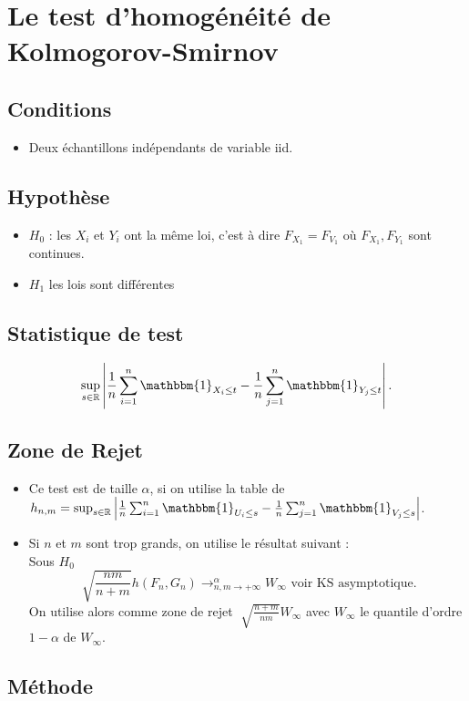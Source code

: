 \documentclass{article}
\theoremstyle{plain}%
\theoremstyle{definition}
\theoremstyle{remark}
\begin{document}
\section{Le test d'homogénéité de Kolmogorov-Smirnov}
\subsection*{Conditions}
\begin{itemize}
    \item Deux échantillons indépendants de variable iid.
\end{itemize}

\subsection*{Hypothèse}
\begin{itemize}
    \item $ H_0 $ : les $ X_i $ et $ Y_i $ ont la même loi, c'est à dire $ F_{X_1} = F_{V_1} $ où $ F_{X_1}, F_{Y_1} $ sont continues.
    \item $ H_1 $ les lois sont différentes
\end{itemize}

\subsection*{Statistique de test}
\[
    \sup _{s \in \mathbb{R}} \left| \frac{1}{n}\sum_{i=1}^{n} \mathbbm{1}_{X_i \leq t} - \frac{1}{n}\sum_{j=1}^{n} \mathbbm{1}_{Y_j \leq t} \right| 
.\]
\subsection*{Zone de Rejet}
\begin{itemize}
    \item Ce test est de taille $ \alpha  $, si on utilise la table de $ h_{n,m} = \sup _{s \in \mathbb{R}} \left| \frac{1}{n}\sum_{i=1}^{n} \mathbbm{1}_{U_i \leq s} - \frac{1}{n}\sum_{j=1}^{n} \mathbbm{1}_{V_j \leq s} \right| $.
    \item Si $ n $ et $ m $ sont trop grands, on utilise le résultat suivant : \\
        Sous $ H_0 $ 
        \[
            \sqrt[]{\frac{nm}{n+m}}h(F_n, G_n) \to ^{\alpha }_{n,m \to +\infty } W_\infty \text{ voir KS asymptotique}
        .\]
        On utilise alors comme zone de rejet $ \sqrt[]{\frac{n+m}{nm}}W_\infty  $ avec $ W_\infty  $ le quantile d'ordre $ 1 - \alpha  $ de $ W_\infty  $.
\end{itemize}

\subsection*{Méthode}
\end{document}

